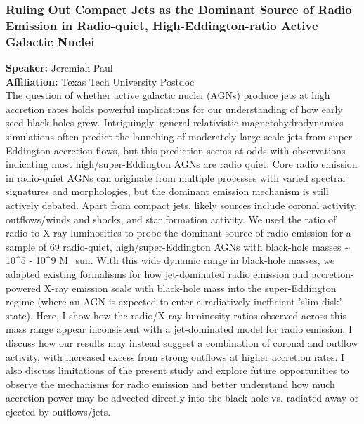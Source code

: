 \subsubsection*{Ruling Out Compact Jets as the Dominant Source of Radio Emission in Radio-quiet, High-Eddington-ratio Active Galactic Nuclei}
\textbf{Speaker:} Jeremiah Paul \\
\textbf{Affiliation:} Texas Tech University \textperiodcentered{} Postdoc\\
The question of whether active galactic nuclei (AGNs) produce jets at high accretion rates holds powerful implications for our understanding of how early seed black holes grew. Intriguingly, general relativistic magnetohydrodynamics simulations often predict the launching of moderately large-scale jets from super-Eddington accretion flows, but this prediction seems at odds with observations indicating most high/super-Eddington AGNs are radio quiet. Core radio emission in radio-quiet AGNs can originate from multiple processes with varied spectral signatures and morphologies, but the dominant emission mechanism is still actively debated. Apart from compact jets, likely sources include coronal activity, outflows/winds and shocks, and star formation activity. We used the ratio of radio to X-ray luminosities to probe the dominant source of radio emission for a sample of 69 radio-quiet, high/super-Eddington AGNs with black-hole masses \textasciitilde{} 10\textasciicircum{}5 - 10\textasciicircum{}9 M\_sun. With this wide dynamic range in black-hole masses, we adapted existing formalisms for how jet-dominated radio emission and accretion-powered X-ray emission scale with black-hole mass into the super-Eddington regime (where an AGN is expected to enter a radiatively inefficient 'slim disk' state). Here, I show how the radio/X-ray luminosity ratios observed across this mass range appear inconsistent with a jet-dominated model for radio emission. I discuss how our results may instead suggest a combination of coronal and outflow activity, with increased excess from strong outflows at higher accretion rates. I also discuss limitations of the present study and explore future opportunities to observe the mechanisms for radio emission and better understand how much accretion power may be advected directly into the black hole vs. radiated away or ejected by outflows/jets.

\hypertarget{abs-41}{}
